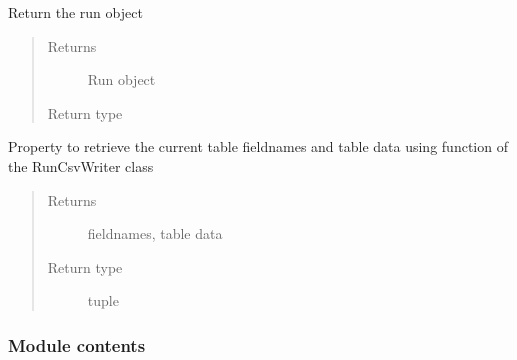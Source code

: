 \documentclass[letterpaper,10pt,english]{sphinxmanual}
\begin{document}
\begin{fulllineitems}

\begin{fulllineitems}
\label{\detokenize{polo.widgets:polo.widgets.table_viewer.TableViewer.run}}
Return the run object
\begin{quote}\begin{description}
\item[{Returns}] \leavevmode
Run object

\item[{Return type}] \leavevmode
{\hyperref[\detokenize{polo.crystallography:polo.crystallography.run.Run}]{}}

\end{description}\end{quote}

\end{fulllineitems}


\begin{fulllineitems}
\label{\detokenize{polo.widgets:polo.widgets.table_viewer.TableViewer.table_data}}
Property to retrieve the current table fieldnames and table data
using  function of the RunCsvWriter class
\begin{quote}\begin{description}
\item[{Returns}] \leavevmode
fieldnames, table data

\item[{Return type}] \leavevmode
tuple

\end{description}\end{quote}

\end{fulllineitems}


\end{fulllineitems}



\subsubsection{Module contents}
\label{\detokenize{polo.widgets:module-polo.widgets}}\label{\detokenize{polo.widgets:module-contents}}
\end{document}
